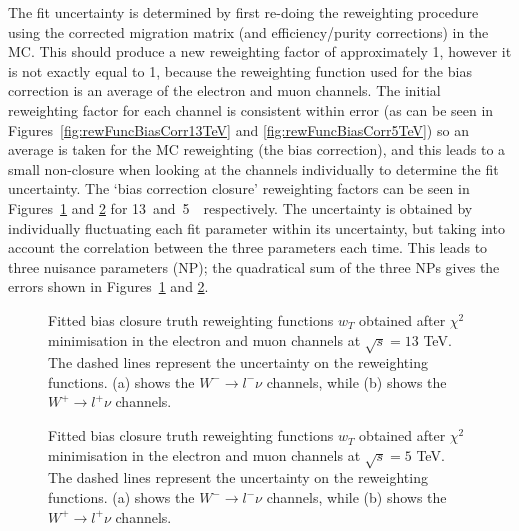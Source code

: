 The fit uncertainty is determined by first re-doing the reweighting procedure using the corrected migration matrix (and efficiency/purity corrections) in the MC. This should produce a new reweighting factor of approximately 1, however it is not exactly equal to 1, because the reweighting function used for the bias correction is an average of the electron and muon channels.
The initial reweighting factor for each channel is consistent within error (as can be seen in Figures~\ref{fig:rewFuncBiasCorr13TeV} and \ref{fig:rewFuncBiasCorr5TeV}) so an average is taken for the MC reweighting (the bias correction), and this leads to a small non-closure when looking at the channels individually to determine the fit uncertainty.
The `bias correction closure' reweighting factors can be seen in Figures~\ref{fig:rewFuncBiasClosure13TeV} and \ref{fig:rewFuncBiasClosure5TeV} for 13~and~5~\TeV\ respectively.
The uncertainty is obtained by individually fluctuating each fit parameter within its uncertainty, but taking into account the correlation between the three parameters each time. This leads to three nuisance parameters (NP); the quadratical sum of the three NPs gives the errors shown in Figures~\ref{fig:rewFuncBiasClosure13TeV} and \ref{fig:rewFuncBiasClosure5TeV}.

\begin{figure}[h]
  \centering
  \caption{Fitted bias closure truth reweighting functions $w_{T}$ obtained after $\chi^2$ minimisation in the electron and muon channels at $\sqrt{s}=13$ TeV. The dashed lines represent the uncertainty on the reweighting functions. (a) shows the $W^{-} \rightarrow l^{-} \nu$ channels, while (b) shows the $W^{+} \rightarrow l^{+} \nu$ channels.}
  \label{fig:rewFuncBiasClosure13TeV}
\end{figure}

\begin{figure}[h]
  \centering
  \caption{Fitted bias closure truth reweighting functions $w_{T}$ obtained after $\chi^2$ minimisation in the electron and muon channels at $\sqrt{s}=5$ TeV. The dashed lines represent the uncertainty on the reweighting functions. (a) shows the $W^{-} \rightarrow l^{-} \nu$ channels, while (b) shows the $W^{+} \rightarrow l^{+} \nu$ channels.}
  \label{fig:rewFuncBiasClosure5TeV}
\end{figure}

